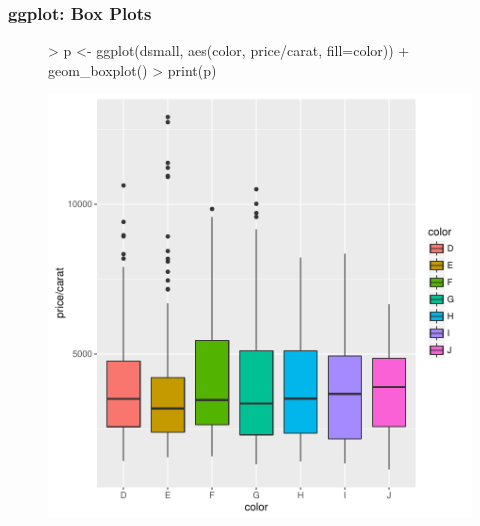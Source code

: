 \documentclass{beamer}
\begin{document}
\begin{frame}[containsverbatim]  
	\frametitle{ggplot: Box Plots}
\scriptsize 
\begin{figure}
  \centering
\begin{Schunk}
\begin{Sinput}
> p <- ggplot(dsmall, aes(color, price/carat, fill=color)) + geom_boxplot()
> print(p) 
\end{Sinput}
\end{Schunk}
\includegraphics{fig--068}
\label{fig:qplotscatter}
\end{figure}
\end{frame}
\end{document}
